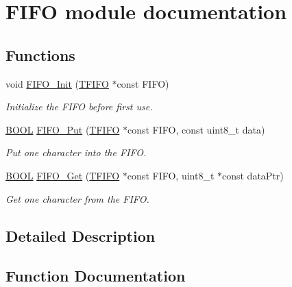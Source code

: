 \hypertarget{group___f_i_f_o__module}{}\section{F\+I\+F\+O module documentation}
\label{group___f_i_f_o__module}
\subsection*{Functions}
\begin{DoxyCompactItemize}
\item 
void \hyperlink{group___f_i_f_o__module_gad9207f49ab9ed061b6dca6063112ca60}{F\+I\+F\+O\+\_\+\+Init} (\hyperlink{struct_t_f_i_f_o}{T\+F\+I\+F\+O} $\ast$const F\+I\+F\+O)
\begin{DoxyCompactList}\small\item\em Initialize the F\+I\+F\+O before first use. \end{DoxyCompactList}\item 
\hyperlink{types_8h_a3e5b8192e7d9ffaf3542f1210aec18dd}{B\+O\+O\+L} \hyperlink{group___f_i_f_o__module_ga2db480eb7af0cb78a93de2d470d75ee7}{F\+I\+F\+O\+\_\+\+Put} (\hyperlink{struct_t_f_i_f_o}{T\+F\+I\+F\+O} $\ast$const F\+I\+F\+O, const uint8\+\_\+t data)
\begin{DoxyCompactList}\small\item\em Put one character into the F\+I\+F\+O. \end{DoxyCompactList}\item 
\hyperlink{types_8h_a3e5b8192e7d9ffaf3542f1210aec18dd}{B\+O\+O\+L} \hyperlink{group___f_i_f_o__module_ga4cd1d90b3e30bfbd1de2e8f5be0699fe}{F\+I\+F\+O\+\_\+\+Get} (\hyperlink{struct_t_f_i_f_o}{T\+F\+I\+F\+O} $\ast$const F\+I\+F\+O, uint8\+\_\+t $\ast$const data\+Ptr)
\begin{DoxyCompactList}\small\item\em Get one character from the F\+I\+F\+O. \end{DoxyCompactList}\end{DoxyCompactItemize}


\subsection{Detailed Description}


\subsection{Function Documentation}
\hypertarget{group___f_i_f_o__module_ga4cd1d90b3e30bfbd1de2e8f5be0699fe}{}
